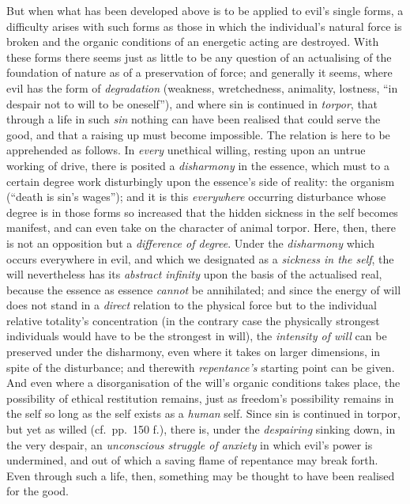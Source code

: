 \documentclass[12pt,a4paper]{book}
\begin{document}
But when what has been developed above is to be applied to evil's single forms,
a difficulty arises with such forms as those in which the individual's natural
force is broken and the organic conditions of an energetic acting are destroyed.
With these forms there seems just as little to be any question of an actualising
of the foundation of nature as of a preservation of force; and generally it
seems, where evil has the form of \emph{degradation} (weakness, wretchedness,
animality, lostness, ``in despair not to will to be oneself''), and where sin is
continued in \emph{torpor}, that through a life in such \emph{sin} nothing can
have been realised that could serve the good, and that a raising up must become
impossible. The relation is here to be apprehended as follows. In \emph{every}
unethical willing, resting upon an untrue working of drive, there is posited a
\emph{disharmony} in the essence, which must to a certain degree work
disturbingly upon the essence's side of reality: the organism (``death is sin's
wages''); and it is this \emph{everywhere} occurring disturbance whose degree is
in those forms so increased that the hidden sickness in the self becomes
manifest, and can even take on the character of animal torpor. Here, then, there
is not an opposition but a \emph{difference of degree}. Under the
\emph{disharmony} which occurs everywhere in evil, and which we designated as a
\emph{sickness in the self}, the will nevertheless has its \emph{abstract
infinity} upon the basis of the actualised real, because the essence as essence
\emph{cannot} be annihilated; and since the energy of will does not stand in a
\emph{direct} relation to the
physical force but to the individual relative totality's concentration (in the
contrary case the physically strongest individuals would have to be the
strongest in will), the \emph{intensity of will} can be preserved under the
disharmony, even where it takes on larger dimensions, in spite of the
disturbance; and therewith \emph{repentance's} starting point can be given. And
even where a disorganisation of the will's organic conditions takes place, the
possibility of ethical restitution remains, just as freedom's possibility
remains in the self so long as the self exists as a \emph{human} self. Since sin
is continued in torpor, but yet as willed (cf.\ pp.\ 150 f.), there is, under
the \emph{despairing} sinking down, in the very despair, an \emph{unconscious
struggle of anxiety} in which evil's power is undermined, and out of which a
saving flame of repentance may break forth. Even through such a life, then,
something may be thought to have been realised for the good.
\end{document}
